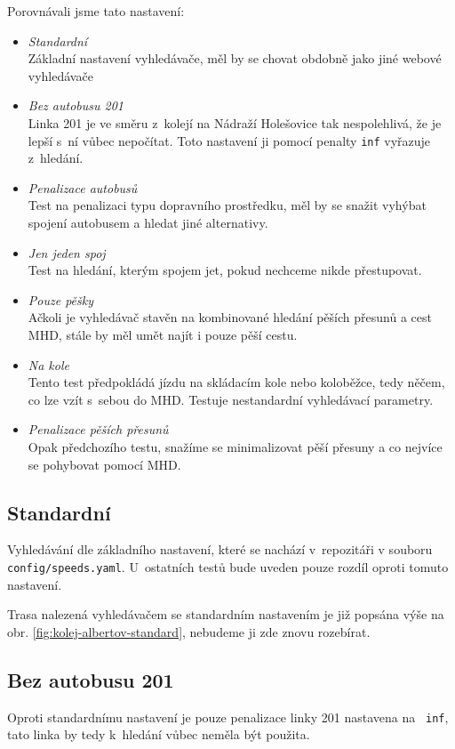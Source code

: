 Porovnávali jsme tato nastavení:
\begin{itemize}
	\item {\em Standardní}\\Základní nastavení vyhledávače, měl by se chovat
	obdobně jako jiné webové vyhledávače
	\item {\em Bez autobusu 201}\\ Linka 201 je ve směru z~kolejí na Nádraží
	Holešovice tak nespolehlivá, že je lepší s~ní vůbec nepočítat. Toto
	nastavení ji pomocí penalty {\tt inf} vyřazuje z~hledání.
	\item {\em Penalizace autobusů}\\ Test na penalizaci typu dopravního
	prostředku, měl by se snažit vyhýbat spojení autobusem a hledat jiné
	alternativy.
	\item {\em Jen jeden spoj}\\ Test na hledání, kterým spojem jet, pokud
	nechceme nikde přestupovat.
	\item {\em Pouze pěšky}\\ Ačkoli je vyhledávač stavěn na kombinované hledání
	pěších přesunů a cest MHD, stále by měl umět najít i pouze pěší cestu.
	\item {\em Na kole}\\ Tento test předpokládá jízdu na skládacím kole nebo
	koloběžce, tedy něčem, co lze vzít s~sebou do MHD. Testuje nestandardní
	vyhledávací parametry.
	\item {\em Penalizace pěších přesunů}\\ Opak předchozího testu, snažíme se
	minimalizovat pěší přesuny a co nejvíce se pohybovat pomocí MHD.
\end{itemize}
\subsection{Standardní}
Vyhledávání dle základního nastavení, které se nachází v~repozitáři v souboru {\tt
config/speeds.yaml}. U~ostatních testů bude uveden pouze rozdíl oproti tomuto
nastavení.

Trasa nalezená vyhledávačem se standardním nastavením je již popsána výše na
obr. \ref{fig:kolej-albertov-standard}, nebudeme ji zde znovu rozebírat.
\subsection{Bez autobusu 201}
Oproti standardnímu nastavení je pouze penalizace linky 201 nastavena na {\tt
inf}, tato linka by tedy k~hledání vůbec neměla být použita.

